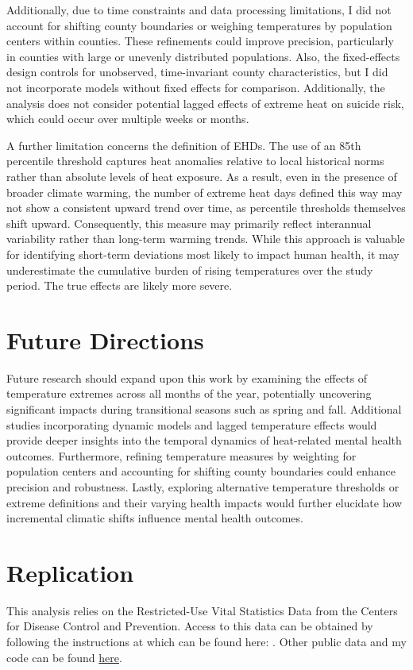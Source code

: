 \documentclass[12pt, a4paper]{article}
\begin{document}
Additionally, due to time constraints and data processing limitations, I did not account for shifting county boundaries or weighing temperatures by population centers within counties. These refinements could improve precision, particularly in counties with large or unevenly distributed populations. Also, the fixed-effects design controls for unobserved, time-invariant county characteristics, but I did not incorporate models without fixed effects for comparison. Additionally, the analysis does not consider potential lagged effects of extreme heat on suicide risk, which could occur over multiple weeks or months.

A further limitation concerns the definition of EHDs. The use of an 85th percentile threshold captures heat anomalies relative to local historical norms rather than absolute levels of heat exposure. As a result,  even in the presence of broader climate warming, the number of extreme heat days defined this way may not show a consistent upward trend over time, as percentile thresholds themselves shift upward. Consequently, this measure may primarily reflect interannual variability rather than long-term warming trends. While this approach is valuable for identifying short-term deviations most likely to impact human health, it may underestimate the cumulative burden of rising temperatures over the study period. The true effects are likely more severe.

\section{Future Directions}
Future research should expand upon this work by examining the effects of temperature extremes across all months of the year, potentially uncovering significant impacts during transitional seasons such as spring and fall. Additional studies incorporating dynamic models and lagged temperature effects would provide deeper insights into the temporal dynamics of heat-related mental health outcomes. Furthermore, refining temperature measures by weighting for population centers and accounting for shifting county boundaries could enhance precision and robustness. Lastly, exploring alternative temperature thresholds or extreme definitions and their varying health impacts would further elucidate how incremental climatic shifts influence mental health outcomes.

\section{Replication}
This analysis relies on the Restricted-Use Vital Statistics Data from the Centers for Disease Control and Prevention. Access to this data can be obtained by following the instructions at which can be found here: \cite{nchsRestrictedData2021}. Other public data and my code can be found \href{https://github.com/baranovski0587/HonorsEconUGThesis}{here}.
\newpage
\end{document}
